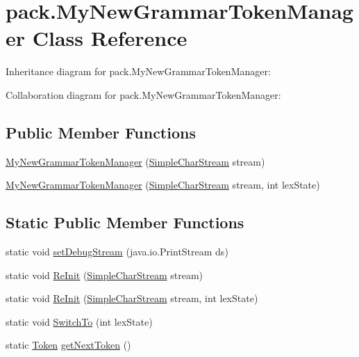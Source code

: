 \hypertarget{classpack_1_1_my_new_grammar_token_manager}{}\section{pack.\+My\+New\+Grammar\+Token\+Manager Class Reference}
\label{classpack_1_1_my_new_grammar_token_manager}


Inheritance diagram for pack.\+My\+New\+Grammar\+Token\+Manager\+:


Collaboration diagram for pack.\+My\+New\+Grammar\+Token\+Manager\+:
\subsection*{Public Member Functions}
\begin{DoxyCompactItemize}
\item 
\hyperlink{classpack_1_1_my_new_grammar_token_manager_aa469189222c3c2e0f4f5896136e96007}{My\+New\+Grammar\+Token\+Manager} (\hyperlink{classpack_1_1_simple_char_stream}{Simple\+Char\+Stream} stream)
\item 
\hyperlink{classpack_1_1_my_new_grammar_token_manager_a29529acbd9ba0fec5854c448fa5711cd}{My\+New\+Grammar\+Token\+Manager} (\hyperlink{classpack_1_1_simple_char_stream}{Simple\+Char\+Stream} stream, int lex\+State)
\end{DoxyCompactItemize}
\subsection*{Static Public Member Functions}
\begin{DoxyCompactItemize}
\item 
static void \hyperlink{classpack_1_1_my_new_grammar_token_manager_a7f44390a243bf1bf9e062274e549d696}{set\+Debug\+Stream} (java.\+io.\+Print\+Stream ds)
\item 
static void \hyperlink{classpack_1_1_my_new_grammar_token_manager_a1315cdec31a0c840f76a1c0b56316e26}{Re\+Init} (\hyperlink{classpack_1_1_simple_char_stream}{Simple\+Char\+Stream} stream)
\item 
static void \hyperlink{classpack_1_1_my_new_grammar_token_manager_ab4a7e38aeb7df544c02e955246e5f9f6}{Re\+Init} (\hyperlink{classpack_1_1_simple_char_stream}{Simple\+Char\+Stream} stream, int lex\+State)
\item 
static void \hyperlink{classpack_1_1_my_new_grammar_token_manager_afbc58004e4e597c80570840e49b383c9}{Switch\+To} (int lex\+State)
\item 
static \hyperlink{classpack_1_1_token}{Token} \hyperlink{classpack_1_1_my_new_grammar_token_manager_a1b003fe269fba1709de8d5bd09cfb878}{get\+Next\+Token} ()
\end{DoxyCompactItemize}
